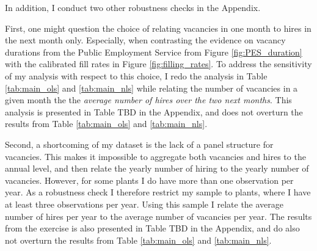 In addition, I conduct two other robustness checks in the Appendix. 

First, one might question the choice of relating vacancies in one month to hires in the next month only. Especially, when contrasting the evidence on vacancy durations from the Public Employment Service from Figure \ref{fig:PES_duration} with the calibrated fill rates in Figure \ref{fig:filling_rates}. To address the sensitivity of my analysis with respect to this choice, I redo the analysis in Table \ref{tab:main_ols} and \ref{tab:main_nls} while relating the number of vacancies in a given month the the \emph{average number of hires over the two next months}. This analysis is presented in Table TBD in the Appendix, and does not overturn the results from Table \ref{tab:main_ols} and \ref{tab:main_nls}.

Second, a shortcoming of my dataset is the lack of a panel structure for vacancies. This makes it impossible to aggregate both vacancies and hires to the annual level, and then relate the yearly number of hiring to the yearly number of vacancies. However, for some plants I do have more than one observation per year. As a robustness check I therefore restrict my sample to plants, where I have at least three observations per year. Using this sample I relate the average number of hires per year to the average number of vacancies per year.  The results from the exercise is also presented in Table TBD in the Appendix, and do also not overturn the results from Table \ref{tab:main_ols} and \ref{tab:main_nls}.